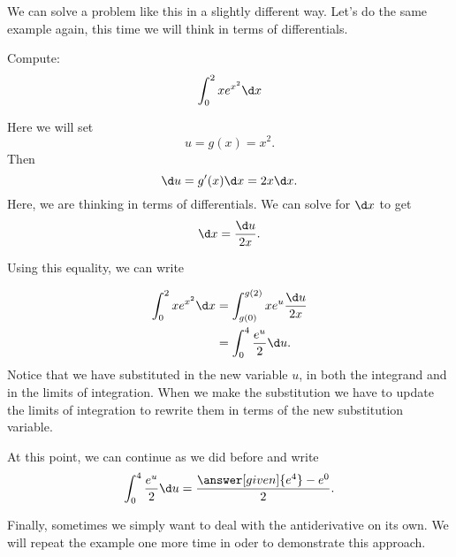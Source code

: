 \documentclass{ximera}
\begin{document}
We can solve a problem like this in a slightly different
way. Let's do the same example again, this time we will think in terms
of differentials.

\begin{example}\label{main example}
	Compute:
	\[
	\int_0^2 x e^{x^2}\d x
	\]
	\begin{explanation}
		Here we will set
		\[ u=g(x) = x^2. \]
		 Then 
		 \[  \d u =g'(x)\d x=2x\d x.  \]
		Here, we are thinking in terms of differentials. We can solve for $\d x$ to get 
		\[ \d x = \frac{\d u}{2x}. \]
		
		Using this equality, we can write
		
		\begin{align*}
		\int_0^2 x e^{x^2}\d x &= \int_{g(0)}^{g(2)} x  e^{u} \frac{\d u}{2x}\\
			  &= \int_{0}^{4} \frac{e^u}{2}\d u .
		\end{align*}
		Notice that we have substituted in the new variable $u$, in both the integrand and in the limits of integration.
		When we make the substitution we have to update the limits of integration to rewrite them in terms of the new substitution variable.
		
		At this point, we can continue as we did before and write
		\[
		 \int_{0}^{4} \frac{e^u}{2}\d u= \frac{\answer[given]{e^4} -e^0}{2}.
		\]
	\end{explanation}
\end{example}

Finally, sometimes we simply want to deal with the antiderivative on
its own.  We will repeat the example one more time in oder to demonstrate this approach.
\end{document}
